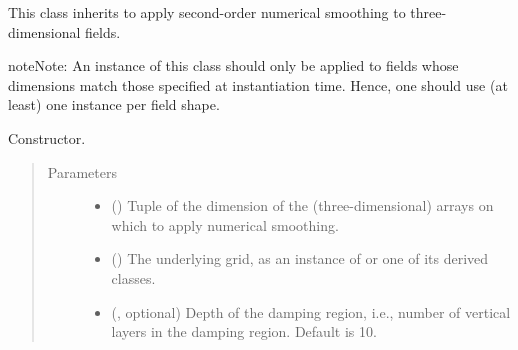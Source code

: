 \documentclass[letterpaper,10pt,english]{sphinxmanual}
\begin{document}
\begin{fulllineitems}
\label{\detokenize{api:dycore.horizontal_smoothing.HorizontalSmoothingSecondOrderXYZ}}
This class inherits {\hyperref[\detokenize{api:dycore.horizontal_smoothing.HorizontalSmoothing}]{}} to apply second-order numerical smoothing to
three-dimensional fields.

\begin{sphinxadmonition}{note}{Note:}
An instance of this class should only be applied to fields whose dimensions match those specified at instantiation time.
Hence, one should use (at least) one instance per field shape.
\end{sphinxadmonition}

\begin{fulllineitems}
\label{\detokenize{api:dycore.horizontal_smoothing.HorizontalSmoothingSecondOrderXYZ.__init__}}
Constructor.
\begin{quote}\begin{description}
\item[{Parameters}] \leavevmode\begin{itemize}
\item {} 
 () \textendash{} Tuple of the dimension of the (three-dimensional) arrays on which to apply numerical smoothing.

\item {} 
 () \textendash{} The underlying grid, as an instance of {\hyperref[\detokenize{api:grids.grid_xyz.GridXYZ}]{}} or one of its derived classes.

\item {} 
 (, optional) \textendash{} Depth of the damping region, i.e., number of vertical layers in the damping region. Default is 10.


\end{itemize}
\end{description}
\end{quote}
\end{fulllineitems}
\end{fulllineitems}
\end{document}
